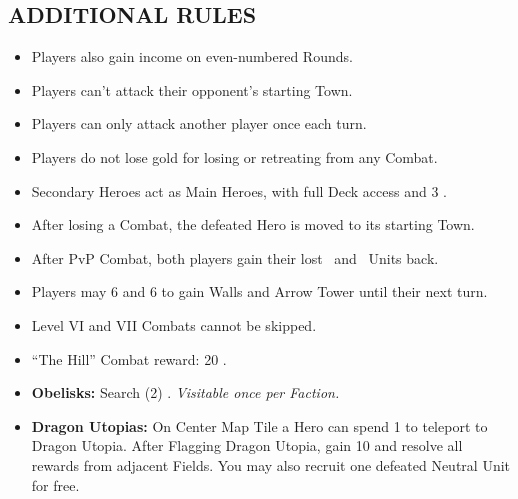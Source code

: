 \begin{multicols}{2}
\subsection*{\MakeUppercase{Additional Rules}}
\begin{itemize}
  \item Players also gain income on even-numbered Rounds.
  \item Players can't attack their opponent's starting Town.
  \item Players can only attack another player once each turn.
  \item Players do not lose gold for losing or retreating from any Combat.
  \item Secondary Heroes act as Main Heroes, with full Deck access and 3 .
  \item After losing a Combat, the defeated Hero is moved to its starting Town.
  \item After PvP Combat, both players gain their lost \bronze\ and \silver\ Units back.
  \item Players may  6  and 6  to gain Walls and Arrow Tower until their next turn.
  \item Level VI and VII Combats cannot be skipped.
  \item ``The Hill'' Combat reward: 20 .
  \item \textbf{Obelisks:} Search (2) . \textit{Visitable once per Faction.}
  \item \textbf{Dragon Utopias:} On Center Map Tile a Hero can spend 1  to teleport to Dragon Utopia. After Flagging Dragon Utopia, gain 10  and resolve all rewards from adjacent Fields. You may also recruit one defeated Neutral Unit for free.
\end{itemize}

\columnbreak

\end{multicols}
